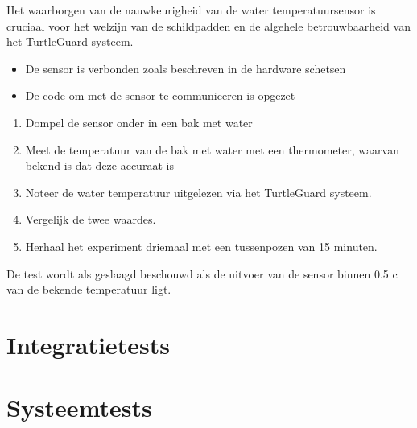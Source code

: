 \documentclass[a4paper]{report}
\newcommand{\turtleguard}{\mbox{TurtleGuard\texttrademark}\xspace}
\begin{document}
\begin{tcolorbox}[colback=white, colframe=black, title=Test Motivatie]
Het waarborgen van de nauwkeurigheid van de water temperatuursensor is cruciaal voor het welzijn van de schildpadden en de algehele betrouwbaarheid van het \turtleguard-systeem.
\end{tcolorbox}

\begin{tcolorbox}[colback=white, colframe=black, title=Test Criteria]
  \begin{itemize}
    \item De sensor is verbonden zoals beschreven in de hardware schetsen 
    \item De code om met de sensor te communiceren is opgezet 
  \end{itemize}
\end{tcolorbox}



\begin{tcolorbox}[colback=white, colframe=black, title=Test Stappen]
  \begin{enumerate}
    \item Dompel de sensor onder in een bak met water 
    \item Meet de temperatuur van de bak met water met een thermometer, waarvan bekend is dat deze accuraat is 
    \item Noteer de water temperatuur uitgelezen via het \turtleguard systeem. 
    \item Vergelijk de twee waardes. 
    \item Herhaal het experiment driemaal met een tussenpozen van 15 minuten. 
  \end{enumerate}
\end{tcolorbox}

\begin{tcolorbox}[colback=white, colframe=black, title=Slagingscriteria]
De test wordt als geslaagd beschouwd als de uitvoer van de sensor binnen 0.5 \textdegree c van de bekende temperatuur ligt.
\end{tcolorbox}


\section{Integratietests}
\section{Systeemtests}
\end{document}
